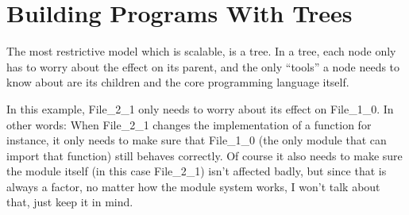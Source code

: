 \documentclass{article}
\begin{document}

\section{Building Programs With Trees}

The most restrictive model which is scalable, is a tree. 
In a tree, each node only has to worry about the effect on its parent, and the only “tools” a node needs to know about are its children and the core programming language itself.


In this example, File\_2\_1 only needs to worry about its effect on File\_1\_0. In other words: When File\_2\_1 changes the implementation of a function for instance, it only needs to make sure that File\_1\_0 (the only module that can import that function) still behaves correctly. Of course it also needs to make sure the module itself (in this case File\_2\_1) isn’t affected badly, but since that is always a factor, no matter how the module system works, I won’t talk about that, just keep it in mind.
\end{document}
